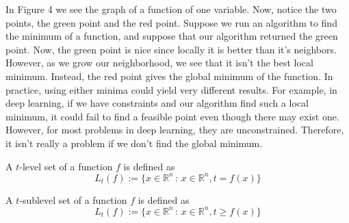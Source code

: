\documentclass[12pt]{article}
\begin{document}
\noindent In Figure 4 we see the graph of a function of one variable. Now, notice the two points, the green point and the red point. Suppose we run an algorithm to find the minimum of a function, and suppose that our algorithm returned the green point. Now, the green point is nice since locally it is better than it's neighbors. However, as we grow our neighborhood, we see that it isn't the best local minimum. Instead, the red point gives the global minimum of the function. In practice, using either minima could yield very different results. For example, in deep learning, if we have constraints and our algorithm find such a local minimum, it could fail to find a feasible point even though there may exist one. However, for most problems in deep learning, they are unconstrained. Therefore, it isn't really a problem if we don't find the global minimum.
\begin{definition}
A $t$-level set of a function $f$ is defined as $$L_t(f):=\{x\in\mathbb{R}^n\,:\,x\in\mathbb{R}^n, t=f(x)\}$$
\end{definition}
\begin{definition}
A $t$-sublevel set of a function $f$ is defined as $$L_t(f):=\{x\in\mathbb{R}^n\,:\,x\in\mathbb{R}^n, t\geqslant f(x)\}$$
\end{definition}
\end{document}
